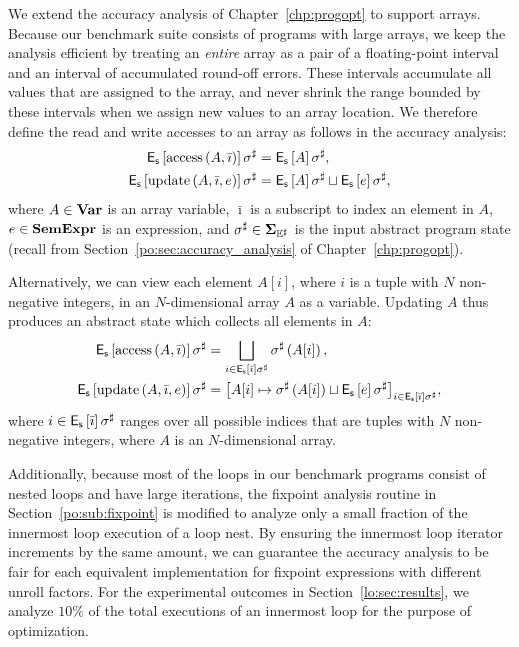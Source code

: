 We extend the accuracy analysis of Chapter~\ref{chp:progopt} to support arrays.
Because our benchmark suite consists of programs with large arrays, we keep
the analysis efficient by treating an \emph{entire} array as a pair of a
floating-point interval and an interval of accumulated round-off errors.  These
intervals accumulate all values that are assigned to the array, and never
shrink the range bounded by these intervals when we assign new values to an
array location.  We therefore define the read and write accesses to an array as
follows in the accuracy analysis:
\begin{equation}
    \begin{aligned}
        \operatorname{\mathsf{E}_\mathsf{s}}\left[{\operatorname{\mathrm{access}}\left({A}, {\bar\imath}\right)}\right]\sigma^\sharp
        &= \operatorname{\mathsf{E}_\mathsf{s}}\left[{A}\right]\sigma^\sharp, \\
        \operatorname{\mathsf{E}_\mathsf{s}}\left[{\operatorname{\mathrm{update}}\left({A}, {\bar\imath}, {e}\right)}\right]\sigma^\sharp
        &= \operatorname{\mathsf{E}_\mathsf{s}}\left[{A}\right]\sigma^\sharp \sqcup
           \operatorname{\mathsf{E}_\mathsf{s}}\left[{e}\right]\sigma^\sharp,
    \end{aligned}
\end{equation}
where $A \in \mathbf{Var}$ is an array variable, $\bar\imath$ is a subscript
to index an element in $A$, $e \in \mathbf{SemExpr}$ is an expression, and
$\sigma^\sharp \in \mathbf{\Sigma}_{\mathbb{E}^\sharp}$ is the input abstract program state (recall from
Section~\ref{po:sec:accuracy_analysis} of Chapter~\ref{chp:progopt}).

Alternatively, we can view each element $A[i]$, where $i$ is a tuple with $N$
non-negative integers, in an $N$-dimensional array $A$ as a variable.  Updating
$A$ thus produces an abstract state which collects all elements in $A$:
\begin{equation}
    \begin{aligned}
        \operatorname{\mathsf{E}_\mathsf{s}}\left[{\operatorname{\mathrm{access}}\left({A}, {\bar\imath}\right)}\right]\sigma^\sharp
        &= \bigsqcup_{i \in \operatorname{\mathsf{E}_\mathsf{s}}\left[{\bar\imath}\right]\sigma^\sharp}
            \sigma^\sharp \left( A[i] \right), \\
        \operatorname{\mathsf{E}_\mathsf{s}}\left[{\operatorname{\mathrm{update}}\left({A}, {\bar\imath}, {e}\right)}\right]\sigma^\sharp
        &= {\left[
            A[i] \mapsto \sigma^\sharp \left( A[i] \right) \sqcup
                \operatorname{\mathsf{E}_\mathsf{s}}\left[{e}\right]\sigma^\sharp
        \right]}_{i \in \operatorname{\mathsf{E}_\mathsf{s}}\left[{\bar\imath}\right]\sigma^\sharp},
    \end{aligned}
\end{equation}
where $i \in \operatorname{\mathsf{E}_\mathsf{s}}\left[{\bar\imath}\right]\sigma^\sharp$ ranges over all possible
indices that are tuples with $N$ non-negative integers, where $A$ is an
$N$-dimensional array.

Additionally, because most of the loops in our benchmark programs consist
of nested loops and have large iterations, the fixpoint analysis routine
in Section~\ref{po:sub:fixpoint} is modified to analyze only a small
fraction of the innermost loop execution of a loop nest.  By ensuring the
innermost loop iterator increments by the same amount, we can guarantee the
accuracy analysis to be fair for each equivalent implementation for fixpoint
expressions with different unroll factors.  For the experimental outcomes in
Section~\ref{lo:sec:results}, we analyze $10\%$ of the total executions of an
innermost loop for the purpose of optimization.

